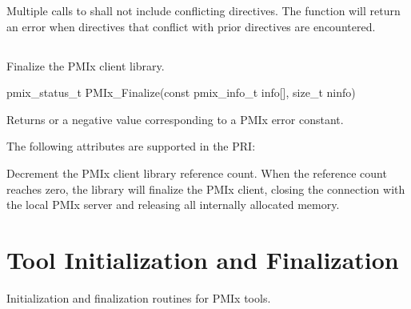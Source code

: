 Multiple calls to  shall not include conflicting directives.
The  function will return an error when directives that conflict with prior directives are encountered.


\subsection{}

\summary

Finalize the PMIx client library.

\format

\cspecificstart
\begin{codepar}
pmix_status_t
PMIx_Finalize(const pmix_info_t info[], size_t ninfo)
\end{codepar}
\cspecificend

\begin{arglist}
\end{arglist}

Returns  or a negative value corresponding to a PMIx error constant.

\priattr
The following attributes are supported in the \ac{PRI}:


\descr

Decrement the \ac{PMIx} client library reference count.
When the reference count reaches zero, the library will finalize the \ac{PMIx} client, closing the connection with the local \ac{PMIx} server and releasing all internally allocated memory.


\section{Tool Initialization and Finalization}
\label{chap:api_init:tool}

Initialization and finalization routines for \ac{PMIx} tools.

\subsection{}

